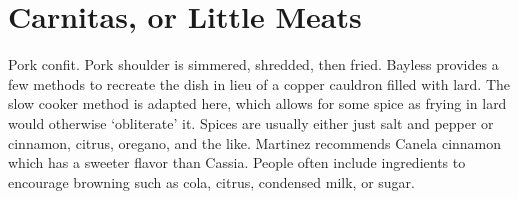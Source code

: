 \section[Carnitas]{Carnitas, or Little Meats}%


\begin{recipestats}[
    servings=6,
    preptime=45~\minute,
    bakingtime=6~\hour,
    source=Mike \& Jane,
    original=Rick~\cite{baylessCarnitas} \& Rick~\cite{martinezCarnitas},
]
\end{recipestats}


\begin{recipeabstract}
    Pork confit.
    Pork shoulder is simmered, shredded, then fried.
    Bayless provides a few methods to recreate the dish in lieu of a copper cauldron filled with lard.
    The slow cooker method is adapted here, which allows for some spice as frying in lard would otherwise `obliterate' it.
    Spices are usually either just salt and pepper or cinnamon, citrus, oregano, and the like.
    Martinez recommends Canela cinnamon which has a sweeter flavor than Cassia.
    People often include ingredients to encourage browning such as cola, citrus, condensed milk, or sugar.
\end{recipeabstract}


\begin{ingredientcolumns}
    \begin{ingredientblock}[pot]
        \\
        \\
        \\
        \\
        \\
        \\
        \\
    \end{ingredientblock}
    \begin{ingredientblock}[sachet]
        \\
        \\
        \\
        \\
        \\
    \end{ingredientblock}
\end{ingredientcolumns}


